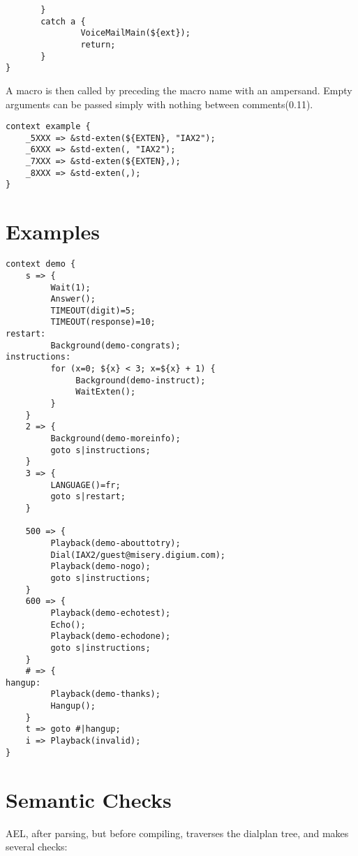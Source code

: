 {\begin{verbatim}
       }
       catch a {
               VoiceMailMain(${ext});
               return;
       }
}
\end{verbatim}

A macro is then called by preceding the macro name with an
ampersand. Empty arguments can be passed simply with nothing between
comments(0.11).

\begin{verbatim}
context example {
    _5XXX => &std-exten(${EXTEN}, "IAX2");
    _6XXX => &std-exten(, "IAX2");
    _7XXX => &std-exten(${EXTEN},);
    _8XXX => &std-exten(,);
}
\end{verbatim}


\section{Examples}

\begin{verbatim}
context demo {
    s => {
         Wait(1);
         Answer();
         TIMEOUT(digit)=5;
         TIMEOUT(response)=10;
restart:
         Background(demo-congrats);
instructions:
         for (x=0; ${x} < 3; x=${x} + 1) {
              Background(demo-instruct);
              WaitExten();
         }
    }
    2 => {
         Background(demo-moreinfo);
         goto s|instructions;
    }
    3 => {
         LANGUAGE()=fr;
         goto s|restart;
    }

    500 => {
         Playback(demo-abouttotry);
         Dial(IAX2/guest@misery.digium.com);
         Playback(demo-nogo);
         goto s|instructions;
    }
    600 => {
         Playback(demo-echotest);
         Echo();
         Playback(demo-echodone);
         goto s|instructions;
    }
    # => {
hangup:
         Playback(demo-thanks);
         Hangup();
    }
    t => goto #|hangup;
    i => Playback(invalid);
}
\end{verbatim}


\section{Semantic Checks}


AEL, after parsing, but before compiling, traverses the dialplan
tree, and makes several checks:

}
